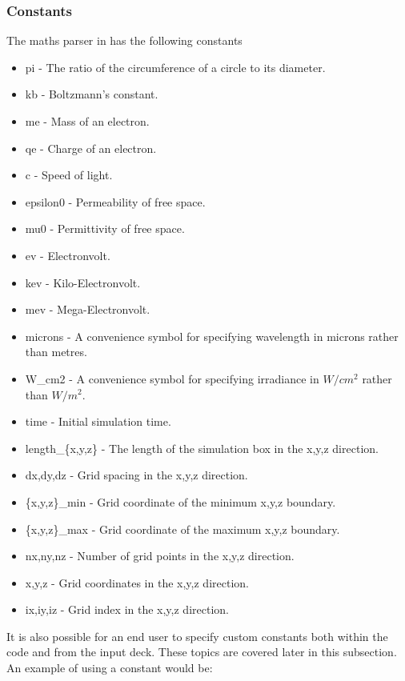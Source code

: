 \documentclass[12pt,a4paper]{article}
\newcommand{\inlinecode}[1]{{\color{warwickred} \bf\texttt{#1}}}
\newcommand{\EPOCH}{{\color{warwickdark}\fontfamily{phv}\selectfont{EPOCH}}}
\begin{document}
\subsubsection{Constants}
\label{sec:constants}
The maths parser in {\EPOCH}  has the following constants
\begin{itemize}
\item pi - The ratio of the circumference of a circle to its diameter.
\item kb - Boltzmann's constant.
\item me - Mass of an electron.
\item qe - Charge of an electron.
\item c - Speed of light.
\item epsilon0 - Permeability of free space.
\item mu0 - Permittivity of free space.
\item ev - Electronvolt.
\item kev - Kilo-Electronvolt.
\item mev - Mega-Electronvolt.
\item microns - A convenience symbol for specifying wavelength in microns
rather than metres.
\item W\_cm2 - A convenience symbol for specifying irradiance in $W/cm^2$
rather than $W/m^2$.
\item time - Initial simulation time.
\item length\_\{x,y,z\} - The length of the simulation box in the x,y,z
  direction.
\item dx,dy,dz - Grid spacing in the x,y,z direction.
\item \{x,y,z\}\_min - Grid coordinate of the minimum x,y,z boundary.
\item \{x,y,z\}\_max - Grid coordinate of the maximum x,y,z boundary.
\item nx,ny,nz - Number of grid points in the x,y,z direction.
\item x,y,z - Grid coordinates in the x,y,z direction.
\item ix,iy,iz - Grid index in the x,y,z direction.
\end{itemize}

It is also possible for an end user to specify custom constants both within
the code and from the input deck. These topics are covered later in this
subsection. An example of using a constant would be:\\
\indent\inlinecode{length\_x = pi}\\
\end{document}
